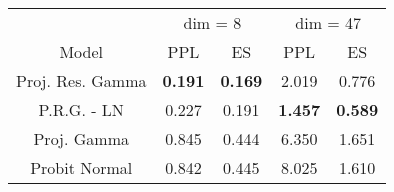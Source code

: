 
\begin{tabular}{ccccc}
\toprule
\multicolumn{1}{c}{ } & \multicolumn{2}{c}{dim = 8} & \multicolumn{2}{c}{dim = 47} \\
\cmidrule(l{3pt}r{3pt}){2-3} \cmidrule(l{3pt}r{3pt}){4-5}
Model & PPL & ES & PPL & ES\\
\midrule
Proj. Res. Gamma & {\bf 0.191} & {\bf 0.169} & 2.019 & 0.776\\
P.R.G. - LN & 0.227 & 0.191 & {\bf 1.457} & {\bf 0.589}\\
Proj. Gamma & 0.845 & 0.444 & 6.350 & 1.651\\
Probit Normal & 0.842 & 0.445 & 8.025 & 1.610\\
\bottomrule
\end{tabular}
